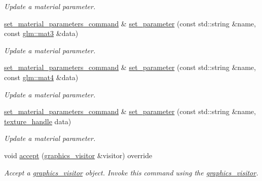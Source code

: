 \begin{DoxyCompactItemize}
\begin{DoxyCompactList}\small\item\em Update a material parameter. \end{DoxyCompactList}\item 
\mbox{\hyperlink{classmoka_1_1set__material__parameters__command}{set\+\_\+material\+\_\+parameters\+\_\+command}} \& \mbox{\hyperlink{classmoka_1_1set__material__parameters__command_a03bcba4c59e969fa1a123db947eab6d6}{set\+\_\+parameter}} (const std\+::string \&name, const \mbox{\hyperlink{namespacemoka_aed2224bc0e5b79e57a8975ded94ee1aaa0dd87e9dfdea657e8be233b5836821d0}{glm\+::mat3}} \&data)
\begin{DoxyCompactList}\small\item\em Update a material parameter. \end{DoxyCompactList}\item 
\mbox{\hyperlink{classmoka_1_1set__material__parameters__command}{set\+\_\+material\+\_\+parameters\+\_\+command}} \& \mbox{\hyperlink{classmoka_1_1set__material__parameters__command_a63d3d8ddf55aa58967dd93c9f3619361}{set\+\_\+parameter}} (const std\+::string \&name, const \mbox{\hyperlink{namespacemoka_aed2224bc0e5b79e57a8975ded94ee1aaabe14b41eb96410ea28b32bc138d885ae}{glm\+::mat4}} \&data)
\begin{DoxyCompactList}\small\item\em Update a material parameter. \end{DoxyCompactList}\item 
\mbox{\hyperlink{classmoka_1_1set__material__parameters__command}{set\+\_\+material\+\_\+parameters\+\_\+command}} \& \mbox{\hyperlink{classmoka_1_1set__material__parameters__command_af665ea4f3250ac00cd3e6ec965f198bb}{set\+\_\+parameter}} (const std\+::string \&name, \mbox{\hyperlink{structmoka_1_1texture__handle}{texture\+\_\+handle}} data)
\begin{DoxyCompactList}\small\item\em Update a material parameter. \end{DoxyCompactList}\item 
void \mbox{\hyperlink{classmoka_1_1set__material__parameters__command_a00ba38678a50c8f1a80dfdc131a93ca7}{accept}} (\mbox{\hyperlink{classmoka_1_1graphics__visitor}{graphics\+\_\+visitor}} \&visitor) override
\begin{DoxyCompactList}\small\item\em Accept a \mbox{\hyperlink{classmoka_1_1graphics__visitor}{graphics\+\_\+visitor}} object. Invoke this command using the \mbox{\hyperlink{classmoka_1_1graphics__visitor}{graphics\+\_\+visitor}}. \end{DoxyCompactList}\end{DoxyCompactItemize}
